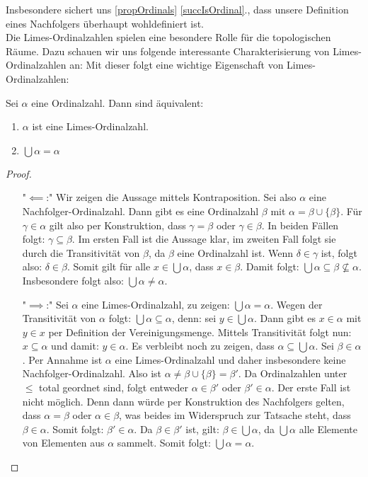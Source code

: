 \documentclass[11pt]{scrartcl}
\begin{document}
Insbesondere sichert uns \ref{propOrdinals} \ref{succIsOrdinal}., dass unsere Definition eines Nachfolgers überhaupt wohldefiniert ist.\\
Die Limes-Ordinalzahlen spielen eine besondere Rolle für die topologischen Räume. Dazu schauen wir uns folgende interessante Charakterisierung von Limes-Ordinalzahlen an:
\noindent Mit dieser folgt eine wichtige Eigenschaft von Limes-Ordinalzahlen:
\begin{theorem}
	Sei $\alpha$ eine Ordinalzahl. Dann sind äquivalent:
	\begin{enumerate}
		\item $\alpha$ ist eine Limes-Ordinalzahl.
		\item $\bigcup \alpha = \alpha$
	\end{enumerate}
\end{theorem}
\begin{proof}\hfill
\begin{itemize}
	\item["$\impliedby$:"] Wir zeigen die Aussage mittels Kontraposition. Sei also $\alpha$ eine Nachfolger-Ordinalzahl. Dann gibt es eine Ordinalzahl $\beta$ mit $\alpha = \beta \cup \{\beta\}$. Für $\gamma\in \alpha$ gilt also per Konstruktion, dass $\gamma = \beta$ oder $\gamma \in \beta$. In beiden Fällen folgt: $\gamma \subseteq \beta$. Im ersten Fall ist die Aussage klar, im zweiten Fall folgt sie durch die Transitivität von $\beta$, da $\beta$ eine Ordinalzahl ist. Wenn $\delta \in \gamma$ ist, folgt also: $\delta \in \beta$. Somit gilt für alle $x\in \bigcup \alpha$, dass $x\in \beta$. Damit folgt: $\bigcup \alpha \subseteq \beta \nsubseteq \alpha$. Insbesondere folgt also: $\bigcup \alpha \neq \alpha$.
	\item["$\implies$:"] Sei $\alpha$ eine Limes-Ordinalzahl, zu zeigen: $\bigcup \alpha = \alpha$. Wegen der Transitivität von $\alpha$ folgt: $\bigcup \alpha \subseteq \alpha$, denn: sei $y\in \bigcup \alpha$. Dann gibt es $x\in \alpha$ mit $y\in x$ per Definition der Vereinigungsmenge. Mittels Transitivität folgt nun: $ x \subseteq \alpha$ und damit: $y\in \alpha$. Es verbleibt noch zu zeigen, dass $\alpha \subseteq \bigcup \alpha$. Sei $\beta\in \alpha$. Per Annahme ist $\alpha$ eine Limes-Ordinalzahl und daher insbesondere keine Nachfolger-Ordinalzahl. Also ist $\alpha \neq \beta \cup \{ \beta\}=\beta'$. Da Ordinalzahlen unter $\leq$ total geordnet sind, folgt entweder $\alpha \in \beta'$ oder $\beta' \in \alpha$. Der erste Fall ist nicht möglich. Denn dann würde per Konstruktion des Nachfolgers gelten, dass $\alpha=\beta$ oder $\alpha \in \beta$, was beides im Widerspruch zur Tatsache steht, dass $\beta \in \alpha$. Somit folgt: $\beta' \in \alpha$. Da $\beta\in \beta'$ ist, gilt: $\beta\in \bigcup \alpha$, da $\bigcup\alpha$ alle Elemente von Elementen aus $\alpha$ sammelt. Somit folgt: $\bigcup \alpha = \alpha$.
\end{itemize}
\end{proof}
\end{document}
